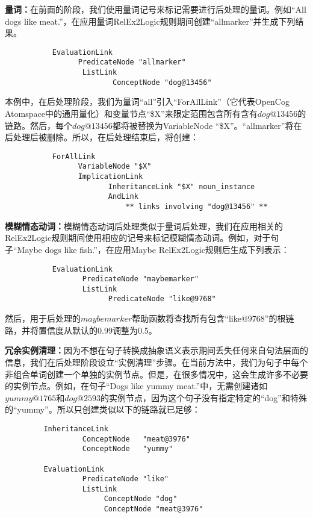 {\bf 量词：}在前面的阶段，我们使用量词记号来标记需要进行后处理的量词。例如“All dogs like meat.”，在应用量词RelEx2Logic规则期间创建“allmarker”并生成下列结果。

\begin{verbatim}
           EvaluationLink
                 PredicateNode "allmarker"
                  ListLink
                         ConceptNode "dog@13456"
\end{verbatim}

本例中，在后处理阶段，我们为量词“all”引入“ForAllLink”（它代表OpenCog Atomspace中的通用量化）和变量节点“\$X”来限定范围包含所有含有$dog@13456$的链路。然后，每个$dog@13456$都将被替换为VariableNode “\$X”。“allmarker”将在后处理后被删除。所以，在后处理结束后，将创建：

\begin{verbatim}
           ForAllLink
                 VariableNode "$X"
                 ImplicationLink 
                        InheritanceLink "$X" noun_instance
                        AndLink
                            ** links involving "dog@13456" **
\end{verbatim}

{\bf 模糊情态动词：}模糊情态动词后处理类似于量词后处理，我们在应用相关的RelEx2Logic规则期间使用相应的记号来标记模糊情态动词。例如，对于句子“Maybe dogs like fish.”，在应用Maybe RelEx2Logic规则后生成下列表示：

\begin{verbatim}
           EvaluationLink
                  PredicateNode "maybemarker"
                  ListLink
                        PredicateNode "like@9768"
\end{verbatim}

然后，用于后处理的$maybemarker$帮助函数将查找所有包含“like@9768”的根链路，并将置信度从默认的0.99调整为0.5。

{\bf 冗余实例清理：}因为不想在句子转换成抽象语义表示期间丢失任何来自句法层面的信息，我们在后处理阶段设立“实例清理”步骤。在当前方法中，我们为句子中每个非组合单词创建一个单独的实例节点。但是，在很多情况中，这会生成许多不必要的实例节点。例如，在句子“Dogs like yummy meat.”中，无需创建诸如$yummy@1765$和$dog@2593$的实例节点，因为这个句子没有指定特定的“dog”和特殊的“yummy”。所以只创建类似以下的链路就已足够：

\begin{verbatim}
         InheritanceLink 
                  ConceptNode   "meat@3976" 
                  ConceptNode   "yummy"

         EvaluationLink 
                  PredicateNode "like"
                  ListLink
                       ConceptNode "dog"
                       ConceptNode "meat@3976"
\end{verbatim}


